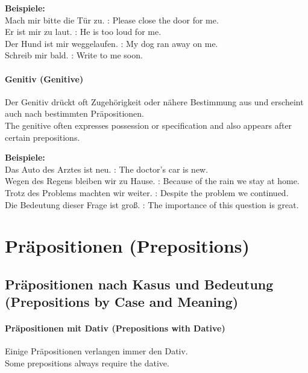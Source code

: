 \documentclass[a4paper]{article}
\begin{document}
            \textbf{Beispiele:}\\
            Mach mir bitte die Tür zu. : Please close the door for me.\\
            Er ist mir zu laut. : He is too loud for me.\\
            Der Hund ist mir weggelaufen. : My dog ran away on me.\\
            Schreib mir bald. : Write to me soon.
        
        \paragraph{Genitiv {\small (Genitive)}}
            Der Genitiv drückt oft Zugehörigkeit oder nähere Bestimmung aus und erscheint auch nach bestimmten Präpositionen.\\
            The genitive often expresses possession or specification and also appears after certain prepositions.
            
            \textbf{Beispiele:}\\
            Das Auto des Arztes ist neu. : The doctor's car is new.\\
            Wegen des Regens bleiben wir zu Hause. : Because of the rain we stay at home.\\
            Trotz des Problems machten wir weiter. : Despite the problem we continued.\\
            Die Bedeutung dieser Frage ist groß. : The importance of this question is great.
    
    
    \section{Präpositionen {\small (Prepositions)}}
    
    \subsection{Präpositionen nach Kasus und Bedeutung {\small (Prepositions by Case and Meaning)}}
        
        \paragraph{Präpositionen mit Dativ {\small (Prepositions with Dative)}}
            Einige Präpositionen verlangen immer den Dativ.\\
            Some prepositions always require the dative.
            
\end{document}
